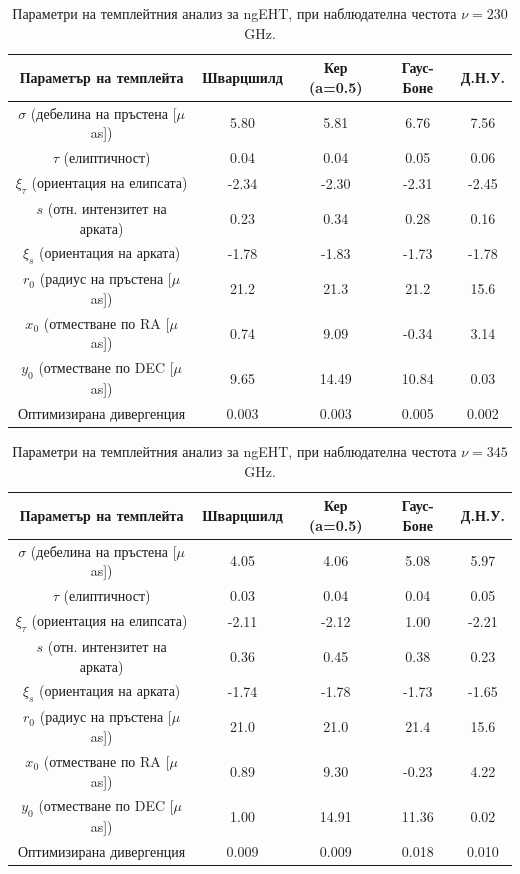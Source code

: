 \newpage

\begin{table}[h!]
	\centering
	\begin{tabular}{c|c|c|c|c}
		\hline
		{Параметър на темплейта} & {Шварцшилд}&{Кер (a=0.5)}&{Гаус-Боне}&{Д.Н.У.}
		\\\hline\hline
		$\sigma$ {(дебелина на пръстена [$\mu$as])} & 5.80&5.81&6.76&7.56
		\\
		$\tau$ {(елиптичност)} & 0.04&0.04&0.05&0.06
		\\
		$\xi_\tau$ {(ориентация на елипсата)} & -2.34&-2.30&-2.31&-2.45
		\\
		$s$ {(отн. интензитет на арката)} & 0.23&0.34&0.28&0.16
		\\
		$\xi_s$ {(ориентация на арката)} & -1.78&-1.83&-1.73&-1.78
		\\\hline
		$r_0$ {(радиус на пръстена [$\mu$as])} & 21.2&21.3&21.2&15.6
		\\
		$x_0$ {(отместване по RA [$\mu$as])} & 0.74&9.09&-0.34&3.14
		\\
		$y_0$ {(отместване по DEC [$\mu$as])} & 9.65& 14.49&10.84&0.03
		\\\hline\hline
		{Оптимизирана дивергенция} & 0.003&0.003&0.005&0.002
		\\ \hline
	\end{tabular}
	\caption[Параметри на темплейтния анализ за ngEHT, при наблюдателна честота $\nu = 230$ GHz.]{Параметри на темплейтния анализ за ngEHT, при наблюдателна честота $\nu = 230$ GHz.}
	\label{table:VIDA_ngEHT}
\end{table}

\begin{table}[h!]
	\centering
	\begin{tabular}{c|c|c|c|c}
		\hline
		{Параметър на темплейта} & {Шварцшилд}&{Кер (a=0.5)}&{Гаус-Боне}&{Д.Н.У.}
		\\\hline\hline
		$\sigma$ {(дебелина на пръстена [$\mu$as])} & 4.05&4.06&5.08&5.97
		\\
		$\tau$ {(елиптичност)} & 0.03&0.04&0.04&0.05
		\\
		$\xi_\tau$ {(ориентация на елипсата)} & -2.11&-2.12&1.00&-2.21
		\\
		$s$ {(отн. интензитет на арката)} & 0.36&0.45&0.38&0.23
		\\
		$\xi_s$ {(ориентация на арката)} & -1.74&-1.78&-1.73&-1.65
		\\\hline
		$r_0$ {(радиус на пръстена [$\mu$as])} & 21.0&21.0&21.4&15.6
		\\
		$x_0$ {(отместване по RA [$\mu$as])} & 0.89&9.30&-0.23&4.22
		\\
		$y_0$ {(отместване по DEC [$\mu$as])} & 1.00& 14.91&11.36&0.02
		\\\hline\hline
		{Оптимизирана дивергенция} & 0.009&0.009&0.018&0.010
		\\ \hline
	\end{tabular}
	\caption[Параметри на темплейтния анализ за ngEHT, при наблюдателна честота $\nu = 345$ GHz.]{Параметри на темплейтния анализ за ngEHT, при наблюдателна честота $\nu = 345$ GHz.}
	\label{table:VIDA_ngEHT_1}
\end{table}

